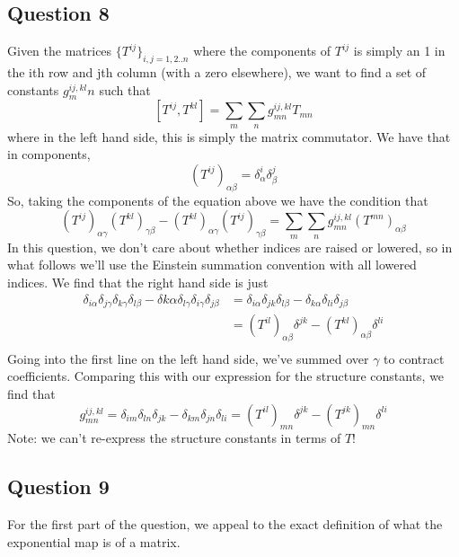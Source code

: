 \documentclass[11pt, oneside]{article}   	%
\theoremstyle{slanted}
\begin{document}
\subsection{Question 8} 
Given the matrices $\{T^{ij} \}_{ i, j = 1, 2 .. n}$ where the components of $T^{ij}$ is simply an 1 in the ith row and jth column (with a zero elsewhere), we want to find a set of constants $g^{ ij, kl }_mn$ such that 
\[ 
	[ T^{ij}, T^{kl} ] = \sum_m \sum_n g^{ ij, kl}_{mn} T_{mn} 
\] 
where in the left hand side, this is simply the matrix commutator. We have that in components, 
\[ 
 	(T^{ij})_{\alpha \beta} = \delta^i_\alpha \delta^j_\beta
\] 
So, taking the components of the equation above we have the condition that 
\[ 
	(T^{ij})_{\alpha\gamma} (T^{kl})_{\gamma \beta}  - (T^{kl})_{\alpha \gamma} (T^{ij})_{\gamma \beta} = \sum_m \sum_n g^{ij, kl}_{mn} (T^{mn})_{\alpha \beta} \]
In this question, we don't care about whether indices are raised or lowered, so in what follows we'll use the Einstein summation convention with all lowered indices. We find that the right hand side is just
\begin{align*} 
	\delta_{i \alpha} \delta_{j \gamma} \delta_{k \gamma} \delta_{ l \beta}  - \delta{k \alpha} \delta_{ l \gamma} \delta_{i \gamma } \delta_{j \beta} & = \delta_{i \alpha} \delta_{j k} \delta_{ l \beta}  - \delta_{ k \alpha} \delta_{ li } \delta_{ j \beta} \\
	&= (T^{ il} )_{\alpha \beta} \delta^{ j k}  - (T^{ kl})_{\alpha \beta} \delta^{li} \\
\end{align*} 
Going into the first line on the left hand side, we've summed over $\gamma$ to contract coefficients. Comparing this with our expression for the structure constants, we find that 
\[ 
 g^{ ij, kl}_{ mn} = \delta_{ im} \delta_{ ln} \delta_{jk}  - \delta_{km}\delta_{jn}\delta_{ li}  = (T^{il})_{mn} \delta^{jk}  - (T^{jk})_{mn} \delta^{li} 
\] 
Note: we can't re-express the structure constants in terms of $ T $!  
\pagebreak 

\subsection{Question 9} 
For the first part of the question, we appeal to 
the exact definition of what the exponential map is of a matrix. 
\end{document}

